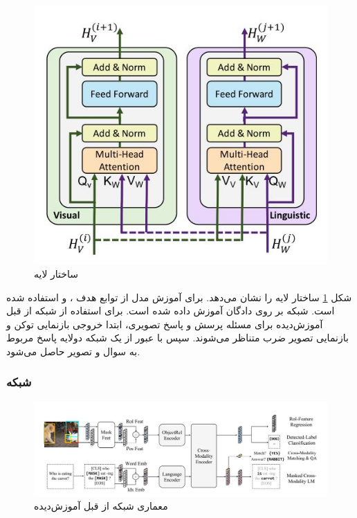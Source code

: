 	\begin{figure}
		\centerline{\includegraphics[scale=0.6]{images/coattentional.JPG}}
		\caption[ساختار لایه ]{ساختار لایه \cite{lu2019vilbert}}
		\label{fig:coattentional}
	\end{figure}
	شکل 
	\ref{fig:coattentional}
	ساختار لایه
	را نشان می‌دهد. برای آموزش مدل
	از توابع هدف
	،
	و 
	استفاده شده است. شبکه
	بر روی ‌دادگان
	آموزش داده شده است. برای استفاده از شبکه از قبل آموزش‌دیده
	برای مسئله پرسش و پاسخ تصویری، ابتدا خروجی بازنمایی توکن
	\lr{[CLS]}
	و بازنمایی تصویر ضرب متناظر می‌شوند. سپس با عبور از یک شبکه 
	دولایه پاسخ مربوط به سوال و تصویر حاصل می‌شود.

\subsubsection{   شبکه }
	\begin{figure}
		\centerline{\includegraphics[scale=0.6]{images/LXMERT.JPG}}
		\caption[ معماری شبکه از قبل آموزش‌دیده ]{معماری شبکه از قبل آموزش‌دیده \cite{tan2019lxmert}}
		\label{fig:LXMERT}
	\end{figure}
	
